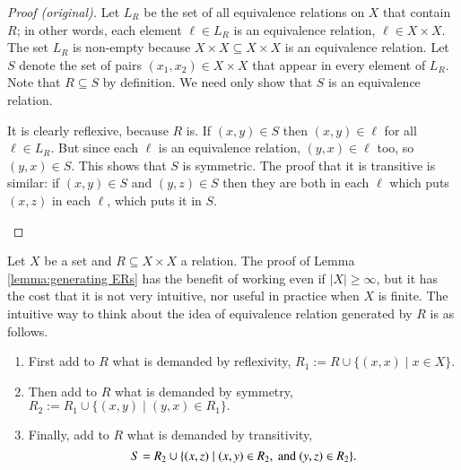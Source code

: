 \documentclass{book}
\def\tn{\textnormal}
\def\ss{\subseteq}
\def\|{{\;|\;}}
\theoremstyle{theoremENG}
\theoremstyle{lemmaENG}
\newtheorem{lemmaENG}[subsubsection]{\begin{english}Lemma\end{english}}
\theoremstyle{propositionENG}
\theoremstyle{corollaryENG}
\theoremstyle{factENG}
\theoremstyle{remarkENG}
\newtheorem{remarkENG}[subsubsection]{\begin{english}Remark\end{english}}
\theoremstyle{exampleENG}
\theoremstyle{warningENG}
\theoremstyle{questionENG}
\theoremstyle{guessENG}
\theoremstyle{answerENG}
\theoremstyle{constructionENG}
\theoremstyle{rulesENG}
\theoremstyle{excENG}
\theoremstyle{appENG}
\theoremstyle{definitionENG}
\theoremstyle{notationENG}
\theoremstyle{conjectureENG}
\theoremstyle{postulateENG}
\newenvironment{proofENG}{\begin{proof}[Proof (original)]}{\end{proof}}
\theoremstyle{theoremRUS}
\theoremstyle{lemmaRUS}
\theoremstyle{propositionRUS}
\theoremstyle{corollaryRUS}
\theoremstyle{factRUS}
\theoremstyle{remarkRUS}
\theoremstyle{exampleRUS}
\theoremstyle{warningRUS}
\theoremstyle{questionRUS}
\theoremstyle{guessRUS}
\theoremstyle{answerRUS}
\theoremstyle{constructionRUS}
\theoremstyle{rulesRUS}
\theoremstyle{excRUS}
\theoremstyle{appRUS}
\theoremstyle{definitionRUS}
\theoremstyle{notationRUS}
\theoremstyle{conjectureRUS}
\theoremstyle{postulateRUS}
\begin{document}
\begin{english}
\begin{lemmaENG}
\begin{russian} \end{russian}

\end{lemmaENG}

\begin{proofENG}

Let $L_R$ be the set of all equivalence relations on $X$ that contain $R$; in other words, each element $\ell\in L_R$ is an equivalence relation, $\ell\in X\times X$. The set $L_R$ is non-empty because $X\times X\ss X\times X$ is an equivalence relation. Let $S$ denote the set of pairs $(x_1,x_2)\in X\times X$ that appear in every element of $L_R$. Note that $R\ss S$ by definition. We need only show that $S$ is an equivalence relation.

\begin{russian} \end{russian}

It is clearly reflexive, because $R$ is. If $(x,y)\in S$ then $(x,y)\in\ell$ for all $\ell\in L_R$. But since each $\ell$ is an equivalence relation, $(y,x)\in\ell$ too, so $(y,x)\in S$. This shows that $S$ is symmetric. The proof that it is transitive is similar: if $(x,y)\in S$ and $(y,z)\in S$ then they are both in each $\ell$ which puts $(x,z)$ in each $\ell$, which puts it in $S$.

\begin{russian} \end{russian}

\end{proofENG}

\begin{remarkENG}

Let $X$ be a set and $R\ss X\times X$ a relation. The proof of Lemma \ref{lemma:generating ERs} has the benefit of working even if $|X|\geq\infty$, but it has the cost that it is not very intuitive, nor useful in practice when $X$ is finite. The intuitive way to think about the idea of equivalence relation generated by $R$ is as follows.
\begin{enumerate}
\item First add to $R$ what is demanded by reflexivity, $R_1:=R\cup\{(x,x)\|x\in X\}$.
\item Then add to $R$ what is demanded by symmetry, $R_2:=R_1\cup\{(x,y)\|(y,x)\in R_1\}.$
\item Finally, add to $R$ what is demanded by transitivity, $$S=R_2\cup\{(x,z)\|(x,y)\in R_2, \tn{ and } (y,z)\in R_2\}.$$
\end{enumerate}


\end{remarkENG}
\end{english}
\end{document}
